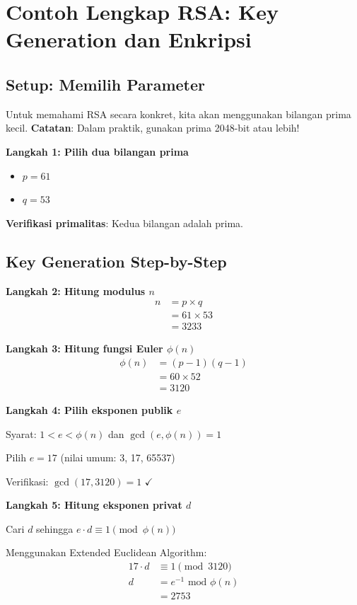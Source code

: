 ﻿\section{Contoh Lengkap RSA: Key Generation dan Enkripsi}

\subsection{Setup: Memilih Parameter}

Untuk memahami RSA secara konkret, kita akan menggunakan bilangan prima kecil. \textbf{Catatan}: Dalam praktik, gunakan prima 2048-bit atau lebih!

\textbf{Langkah 1: Pilih dua bilangan prima}
\begin{itemize}
  \item $p = 61$
  \item $q = 53$
\end{itemize}

\textbf{Verifikasi primalitas}: Kedua bilangan adalah prima.

\subsection{Key Generation Step-by-Step}

\textbf{Langkah 2: Hitung modulus $n$}
\begin{align*}
n &= p \times q \\
  &= 61 \times 53 \\
  &= 3233
\end{align*}

\textbf{Langkah 3: Hitung fungsi Euler $\phi(n)$}
\begin{align*}
\phi(n) &= (p-1)(q-1) \\
        &= 60 \times 52 \\
        &= 3120
\end{align*}

\textbf{Langkah 4: Pilih eksponen publik $e$}

Syarat: $1 < e < \phi(n)$ dan $\gcd(e, \phi(n)) = 1$

Pilih $e = 17$ (nilai umum: 3, 17, 65537)

Verifikasi: $\gcd(17, 3120) = 1$ $\checkmark$

\textbf{Langkah 5: Hitung eksponen privat $d$}

Cari $d$ sehingga $e \cdot d \equiv 1 \pmod{\phi(n)}$

Menggunakan Extended Euclidean Algorithm:
\begin{align*}
17 \cdot d &\equiv 1 \pmod{3120} \\
d &= e^{-1} \text{ mod } \phi(n) \\
  &= 2753
\end{align*}

